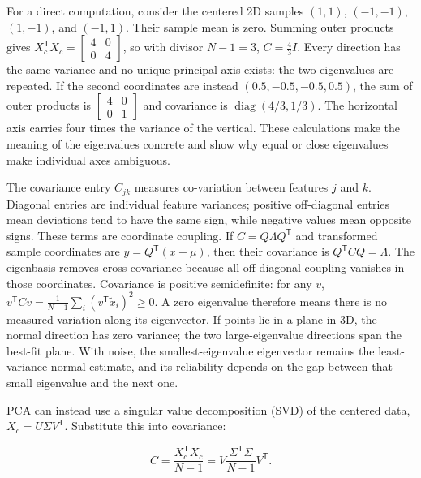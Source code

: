 For a direct computation, consider the centered 2D samples \((1,1)\), \((-1,-1)\), \((1,-1)\), and \((-1,1)\). Their sample mean is zero. Summing outer products gives \(X_c^\mathsf TX_c=\begin{bmatrix}4&0\\0&4\end{bmatrix}\), so with divisor \(N-1=3\), \(C=\frac43I\). Every direction has the same variance and no unique principal axis exists: the two eigenvalues are repeated. If the second coordinates are instead \((0.5,-0.5,-0.5,0.5)\), the sum of outer products is \(\begin{bmatrix}4&0\\0&1\end{bmatrix}\) and covariance is \(\operatorname{diag}(4/3,1/3)\). The horizontal axis carries four times the variance of the vertical. These calculations make the meaning of the eigenvalues concrete and show why equal or close eigenvalues make individual axes ambiguous.

The covariance entry \(C_{jk}\) measures co-variation between features \(j\) and \(k\). Diagonal entries are individual feature variances; positive off-diagonal entries mean deviations tend to have the same sign, while negative values mean opposite signs. These terms are coordinate coupling. If \(C=Q\Lambda Q^\mathsf T\) and transformed sample coordinates are \(y=Q^\mathsf T(x-\mu)\), then their covariance is \(Q^\mathsf TCQ=\Lambda\). The eigenbasis removes cross-covariance because all off-diagonal coupling vanishes in those coordinates. Covariance is positive semidefinite: for any \(v\), \(v^\mathsf TCv=\frac1{N-1}\sum_i(v^\mathsf T\tilde x_i)^2\ge0\). A zero eigenvalue therefore means there is no measured variation along its eigenvector. If points lie in a plane in 3D, the normal direction has zero variance; the two large-eigenvalue directions span the best-fit plane. With noise, the smallest-eigenvalue eigenvector remains the least-variance normal estimate, and its reliability depends on the gap between that small eigenvalue and the next one.

PCA can instead use a \hyperref[02-foundations-ii-ch024-full-thin-and-compact-shapes-for-tall-and-wide-matrices]{singular value decomposition (SVD)} of the centered data, \(X_c=U\Sigma V^\mathsf T\). Substitute this into covariance:

\[
C=\frac{X_c^\mathsf TX_c}{N-1}
=V\frac{\Sigma^\mathsf T\Sigma}{N-1}V^\mathsf T.
\]

